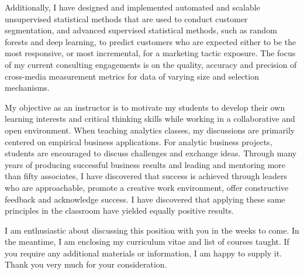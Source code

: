 Additionally, I have designed and implemented automated and scalable unsupervised statistical methods that are used to conduct customer segmentation, and advanced supervised statistical methods, such as random forests and deep learning, to predict customers who are expected either to be the most responsive, or most incremental, for a marketing tactic exposure.  The focus of my current consulting engagements is on the quality, accuracy and precision of cross-media measurement metrics for data of varying size and selection mechanisms.%

\vspace{2.0ex}

My objective as an instructor is to motivate my students to develop their own learning interests and critical thinking skills while working in a collaborative and open environment.  When teaching analytics classes, my discussions are primarily centered on empirical business applications.  For analytic business projects, students are encouraged to discuss challenges and exchange ideas.  Through many years of producing successful business results and leading and mentoring more than fifty associates, I have discovered that success is achieved through leaders who are approachable, promote a creative work environment, offer constructive feedback and acknowledge success.  I have discovered that applying these same principles in the classroom have yielded equally positive results.  \\

\vspace{2.0ex}

I am enthusiastic about discussing this position with you in the weeks to come. In the meantime, I am enclosing my curriculum vitae and list of courses taught.  If you require any additional materials or information, I am happy to supply it. Thank you very much for your consideration. \\


